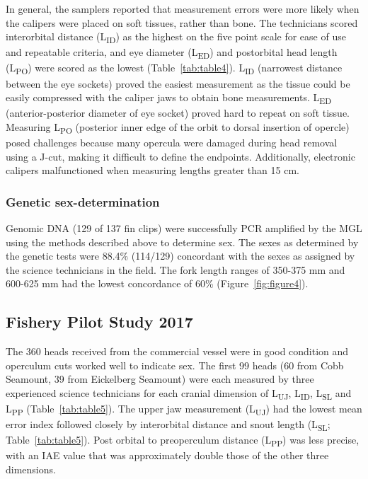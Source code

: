\documentclass[12pt]{article}\usepackage[]{graphicx}\usepackage[]{color}
\begin{document}
In general, the samplers reported that measurement errors were more likely when the calipers were placed on soft tissues, rather than bone. The technicians scored interorbital distance (L\textsubscript{ID}) as the highest on the five point scale for ease of use and repeatable criteria, and eye diameter (L\textsubscript{ED}) and postorbital head length (L\textsubscript{PO}) were scored as the lowest (Table~\ref{tab:table4}). L\textsubscript{ID} (narrowest distance between the eye sockets) proved the easiest measurement as the tissue could be easily compressed with the caliper jaws to obtain bone measurements. L\textsubscript{ED} (anterior-posterior diameter of eye socket) proved hard to repeat on soft tissue. Measuring L\textsubscript{PO} (posterior inner edge of the orbit to dorsal insertion of opercle) posed challenges because many opercula were damaged during head removal using a J-cut, making it difficult to define the endpoints. Additionally, electronic calipers malfunctioned when measuring lengths greater than 15 cm.

\hypertarget{genetic-sex-determination}{%
\subsubsection{Genetic sex-determination}\label{genetic-sex-determination}}

Genomic DNA (129 of 137 fin clips) were successfully PCR amplified by the MGL using the methods described above to determine sex. The sexes as determined by the genetic tests were 88.4\% (114/129) concordant with the sexes as assigned by the science technicians in the field. The fork length ranges of 350-375 mm and 600-625 mm had the lowest concordance of 60\% (Figure~\ref{fig:figure4}).

\hypertarget{fishery-pilot-study-2017-1}{%
\subsection{Fishery Pilot Study 2017}\label{fishery-pilot-study-2017-1}}

The 360 heads received from the commercial vessel were in good condition and operculum cuts worked well to indicate sex. The first 99 heads (60 from Cobb Seamount, 39 from Eickelberg Seamount) were each measured by three experienced science technicians for each cranial dimension of L\textsubscript{UJ}, L\textsubscript{ID}, L\textsubscript{SL} and L\textsubscript{PP} (Table~\ref{tab:table5}). The upper jaw measurement (L\textsubscript{UJ}) had the lowest mean error index followed closely by interorbital distance and snout length (L\textsubscript{SL}; Table~\ref{tab:table5}). Post orbital to preoperculum distance (L\textsubscript{PP}) was less precise, with an IAE value that was approximately double those of the other three dimensions.
\end{document}
